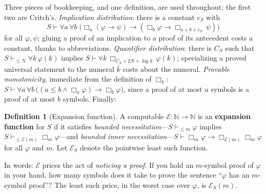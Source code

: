 \documentclass[11pt]{amsart}
\theoremstyle{plain}
\theoremstyle{definition}
\newtheorem{definition}[theorem]{Definition}
\newcommand{\num}[1]{\overline{#1}}
\begin{document}
Three pieces of bookkeeping, and one definition, are used throughout; the first two are Critch's. \emph{Implication distribution}: there is a constant $c_S$ with
\[
S \vdash \forall a\,\forall b\;\bigl(\Box_a(\varphi \to \psi) \to (\Box_b \varphi \to \Box_{a+b+c_S}\, \psi)\bigr)
\]
for all $\varphi,\psi$; gluing a proof of an implication to a proof of its antecedent costs a constant, thanks to abbreviations. \emph{Quantifier distribution}: there is $C_S$ such that $S \vdash_{\le N} \forall k\, \varphi(k)$ implies $S \vdash \forall k\, \Box_{C_S + 2N + \log k}\, \varphi(k)$; specializing a proved universal statement to the numeral $\num{k}$ costs about the numeral. \emph{Provable monotonicity}, immediate from the definition of $\Box_k$: $S \vdash \forall a\,\forall b\,\bigl((a \le b \wedge \Box_a\varphi) \to \Box_b\varphi\bigr)$, since a proof of at most $a$ symbols is a proof of at most $b$ symbols. Finally:

\begin{definition}[Expansion function]
\label{def:expansion}
A computable $\mathcal{E}\colon \mathbb{N} \to \mathbb{N}$ is an \textbf{expansion function} for $S$ if it satisfies \emph{bounded necessitation}---$S \vdash_{\le m} \varphi$ implies $S \vdash_{\le \mathcal{E}(m)} \Box_m \varphi$---and \emph{bounded inner necessitation}---$S \vdash \Box_m \varphi \to \Box_{\mathcal{E}(m)} \Box_m \varphi$ for all $\varphi$ and $m$. Let $\mathcal{E}_S$ denote the pointwise least such function.
\end{definition}

In words: $\mathcal{E}$ prices the act of \emph{noticing a proof}. If you hold an $m$-symbol proof of $\varphi$ in your hand, how many symbols does it take to prove the sentence ``$\varphi$ has an $m$-symbol proof''? The least such price, in the worst case over $\varphi$, is $\mathcal{E}_S(m)$.
\end{document}
